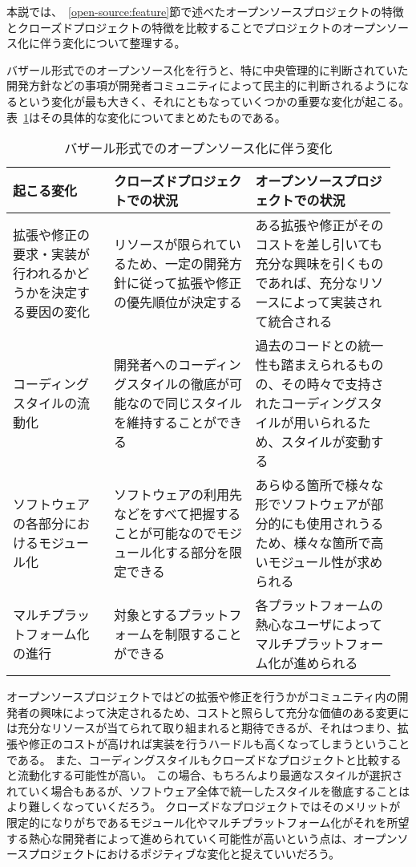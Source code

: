 本説では、~\ref{open-source:feature}節で述べたオープンソースプロジェクトの特徴とクローズドプロジェクトの特徴を比較することでプロジェクトのオープンソース化に伴う変化について整理する。

バザール形式でのオープンソース化を行うと、特に中央管理的に判断されていた開発方針などの事項が開発者コミュニティによって民主的に判断されるようになるという変化が最も大きく、それにともなっていくつかの重要な変化が起こる。
表~\ref{table:open-source-change}はその具体的な変化についてまとめたものである。

\begin{table}[!hbtp]
    \begin{center}
        \caption{バザール形式でのオープンソース化に伴う変化}
        \begin{tabular}{|p{0.25\linewidth}|p{0.35\linewidth}|p{0.35\linewidth}|}
            \hline
            起こる変化 & クローズドプロジェクトでの状況 & オープンソースプロジェクトでの状況 \\
            \hline
            \hline
            拡張や修正の要求・実装が行われるかどうかを決定する要因の変化 & リソースが限られているため、一定の開発方針に従って拡張や修正の優先順位が決定する & ある拡張や修正がそのコストを差し引いても充分な興味を引くものであれば、充分なリソースによって実装されて統合される \\
            \hline
            コーディングスタイルの流動化 & 開発者へのコーディングスタイルの徹底が可能なので同じスタイルを維持することができる & 過去のコードとの統一性も踏まえられるものの、その時々で支持されたコーディングスタイルが用いられるため、スタイルが変動する \\
            \hline
            ソフトウェアの各部分におけるモジュール化 & ソフトウェアの利用先などをすべて把握することが可能なのでモジュール化する部分を限定できる & あらゆる箇所で様々な形でソフトウェアが部分的にも使用されうるため、様々な箇所で高いモジュール性が求められる \\
            \hline
            マルチプラットフォーム化の進行 & 対象とするプラットフォームを制限することができる & 各プラットフォームの熱心なユーザによってマルチプラットフォーム化が進められる \\
            \hline
        \end{tabular}
        \label{table:open-source-change}
    \end{center}
\end{table}

オープンソースプロジェクトではどの拡張や修正を行うかがコミュニティ内の開発者の興味によって決定されるため、コストと照らして充分な価値のある変更には充分なリソースが当てられて取り組まれると期待できるが、それはつまり、拡張や修正のコストが高ければ実装を行うハードルも高くなってしまうということである。
また、コーディングスタイルもクローズドなプロジェクトと比較すると流動化する可能性が高い。
この場合、もちろんより最適なスタイルが選択されていく場合もあるが、ソフトウェア全体で統一したスタイルを徹底することはより難しくなっていくだろう。
クローズドなプロジェクトではそのメリットが限定的になりがちであるモジュール化やマルチプラットフォーム化がそれを所望する熱心な開発者によって進められていく可能性が高いという点は、オープンソースプロジェクトにおけるポジティブな変化と捉えていいだろう。

